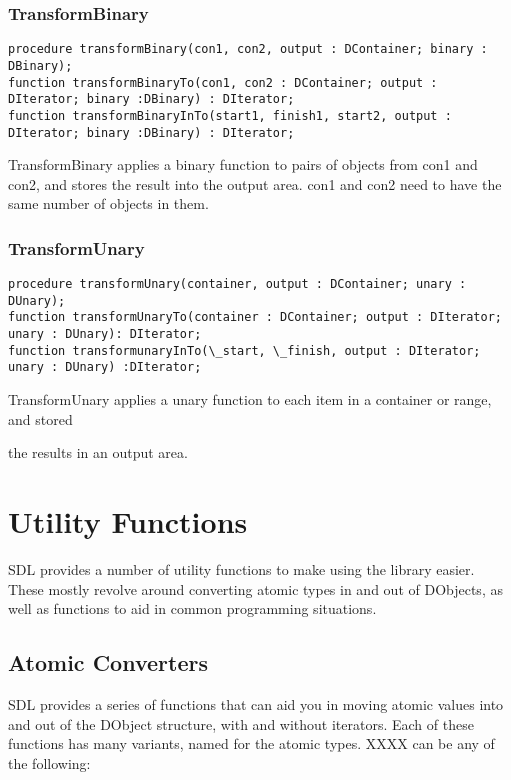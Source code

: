 \documentclass{report}
\begin{document}
\subsection{TransformBinary}


\begin{lstlisting}
procedure transformBinary(con1, con2, output : DContainer; binary : DBinary);
function transformBinaryTo(con1, con2 : DContainer; output : DIterator; binary :DBinary) : DIterator;
function transformBinaryInTo(start1, finish1, start2, output : DIterator; binary :DBinary) : DIterator;
\end{lstlisting}

TransformBinary applies a binary function to pairs of objects from con1 and
con2, and stores the result into the output area. con1 and con2 need to have
the same number of objects in them.

\subsection{TransformUnary}

\begin{lstlisting}
procedure transformUnary(container, output : DContainer; unary : DUnary);
function transformUnaryTo(container : DContainer; output : DIterator; unary : DUnary): DIterator;
function transformunaryInTo(\_start, \_finish, output : DIterator; unary : DUnary) :DIterator;
\end{lstlisting}

TransformUnary applies a unary function to each item 
in a container or range, and stored

the results in an output area.

\chapter{Utility Functions}

SDL provides a number of utility functions to make using the library easier.
These mostly revolve around converting atomic types in and out of DObjects,
as well as functions to aid in common programming situations.

\section{Atomic Converters}

SDL provides a series of functions that can aid you in moving atomic values
into and out of the DObject structure, with and without iterators. Each of
these functions has many variants, named for the atomic types. XXXX can be
any of the following:
\end{document}
